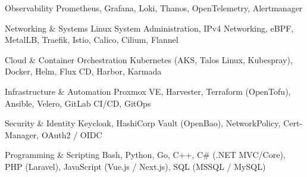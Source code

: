 
\begin{cvskills}

  \cvskill
    {Observability} %
    {Prometheus, Grafana, Loki, Thanos, OpenTelemetry, Alertmanager} %

  \cvskill
    {Networking \& Systems} %
    {Linux System Administration, IPv4 Networking, eBPF, MetalLB, Traefik, Istio, Calico, Cilium, Flannel} %

  \cvskill
    {Cloud \& Container Orchestration} %
    {Kubernetes (AKS, Talos Linux, Kubespray), Docker, Helm, Flux CD, Harbor, Karmada} %

  \cvskill
    {Infrastructure \& Automation} %
    {Proxmox VE, Harvester, Terraform (OpenTofu), Ansible, Velero, GitLab CI/CD, GitOps} %

  \cvskill
    {Security \& Identity} %
    {Keycloak, HashiCorp Vault (OpenBao), NetworkPolicy, Cert-Manager, OAuth2 / OIDC} %

  \cvskill
    {Programming \& Scripting} %
    {Bash, Python, Go, C++, C\# (.NET MVC/Core), PHP (Laravel), JavaScript (Vue.js / Next.js), SQL (MSSQL / MySQL)} %

\end{cvskills}
